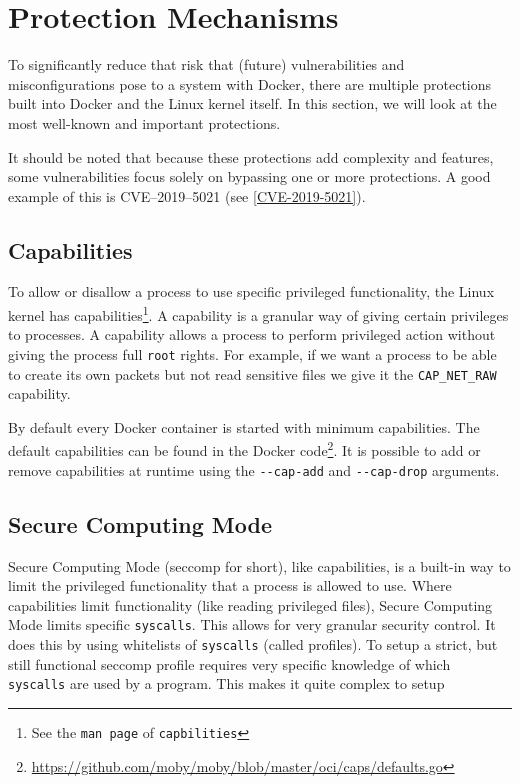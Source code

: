 \section{Protection Mechanisms}

To significantly reduce that risk that (future) vulnerabilities and misconfigurations pose to a system with Docker, there are multiple protections built into Docker and the Linux kernel itself. In this section, we will look at the most well-known and important protections.

\hfill

It should be noted that because these protections add complexity and features, some vulnerabilities focus solely on bypassing one or more protections. A good example of this is CVE--2019--5021 (see \autoref{CVE-2019-5021}).

\subsection{Capabilities}\label{capabilities}
To allow or disallow a process to use specific privileged functionality, the Linux kernel has capabilities\footnote{See the \lstinline{man page} of \lstinline{capbilities}}. A capability is a granular way of giving certain privileges to processes. A capability allows a process to perform privileged action without giving the process full \lstinline{root} rights. For example, if we want a process to be able to create its own packets but not read sensitive files we give it the \lstinline{CAP_NET_RAW} capability.

\hfill

By default every Docker container is started with minimum capabilities. The default capabilities can be found in the Docker code\footnote{\url{https://github.com/moby/moby/blob/master/oci/caps/defaults.go}}. It is possible to add or remove capabilities at runtime using the \lstinline{--cap-add} and \lstinline{--cap-drop}\cite{More-Secure-Non-Root-Container} arguments.

\subsection{Secure Computing Mode}
Secure Computing Mode (seccomp for short), like capabilities, is a built-in way to limit the privileged functionality that a process is allowed to use. Where capabilities limit functionality (like reading privileged files), Secure Computing Mode limits specific \lstinline{syscalls}. This allows for very granular security control. It does this by using whitelists of \lstinline{syscalls} (called profiles).
To setup a strict, but still functional seccomp profile requires very specific knowledge of which \lstinline{syscalls} are used by a program. This makes it quite complex to setup

